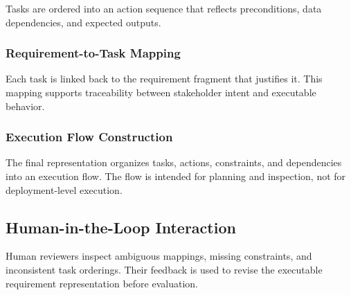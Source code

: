 Tasks are ordered into an action sequence that reflects preconditions, data dependencies, and expected outputs.

\subsubsection{Requirement-to-Task Mapping}
\label{sec:method-mapping}

Each task is linked back to the requirement fragment that justifies it.
This mapping supports traceability between stakeholder intent and executable behavior.

\subsubsection{Execution Flow Construction}
\label{sec:method-flow}

The final representation organizes tasks, actions, constraints, and dependencies into an execution flow.
The flow is intended for planning and inspection, not for deployment-level execution.

\subsection{Human-in-the-Loop Interaction}
\label{sec:method-hitl}

Human reviewers inspect ambiguous mappings, missing constraints, and inconsistent task orderings.
Their feedback is used to revise the executable requirement representation before evaluation.
